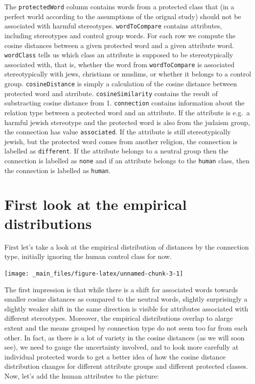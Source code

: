 \documentclass[12pt,]{book}
\begin{document}
\normalsize

The \texttt{protectedWord} column contains words from a protected class
that (in a perfect world according to the assumptions of the orignal
study) should not be associated with harmful stereotypes.
\texttt{wordToCompare} contains attributes, including stereotypes and
control group words. For each row we compute the cosine distances
between a given protected word and a given attribute word.
\texttt{wordClass} tells us which class an attribute is supposed to be
stereotypically associated with, that is, whether the word from
\texttt{wordToCompare} is associated stereotypically with jews,
christians or muslims, or whether it belongs to a control group.
\texttt{cosineDistance} is simply a calculation of the cosine distance
between protected word and atrribute. \texttt{cosineSimilarity} contains
the result of substracting cosine distance from 1. \texttt{connection}
contains information about the relation type between a protected word
and an attribute. If the attribute is e.g.~a harmful jewish stereotype
and the protected word is also from the judaism group, the connection
has value \texttt{associated}. If the attribute is still stereotypically
jewish, but the protected word comes from another religion, the
connection is labelled as \texttt{different}. If the attribute belongs
to a neutral group then the connection is labelled as \texttt{none} and
if an attribute belongs to the \texttt{human} class, then the connection
is labelled as \texttt{human}.

\section{First look at the empirical
distributions}\label{first-look-at-the-empirical-distributions}

First let's take a look at the empirical distribution of distances by
the connection type, initially ignoring the human control class for now.

\vspace{1mm} \footnotesize

\begin{center}\texttt{[image: \_main\_files/figure-latex/unnamed-chunk-3-1]} \end{center}

\normalsize

The first impression is that while there is a shift for associated words
towards smaller cosine distances as compared to the neutral words,
slightly surprisingly a slightly weaker shift in the same direction is
visible for attributes associated with different stereotypes. Moreover,
the empirical distributions overlap to alarge extent and the means
grouped by connection type do not seem too far from each other. In fact,
as there is a lot of variety in the cosine distances (as we will soon
see), we need to gauge the uncertainty involved, and to look more
carefully at individual protected words to get a better idea of how the
cosine distance distribution changes for different attribute groups and
different protected classes. Now, let's add the human attributes to the
picture:
\end{document}
